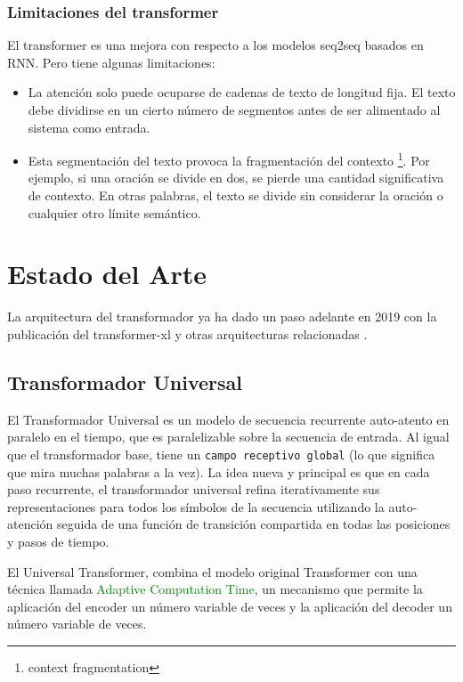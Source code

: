 \documentclass[conference]{IEEEtran}
\begin{document}
\subsubsection{Limitaciones del transformer}
El transformer es una mejora con respecto a los modelos seq2seq basados en RNN. Pero tiene algunas limitaciones:

\begin{itemize}
\item La atenci\'on solo puede ocuparse de cadenas de texto de longitud fija. El texto debe dividirse en un cierto n\'umero de segmentos  antes de ser alimentado al sistema como entrada.
\item Esta segmentaci\'on del texto provoca la fragmentaci\'on del contexto \footnote{context fragmentation}. Por ejemplo, si una oraci\'on se divide en dos, se pierde una cantidad significativa de contexto. En otras palabras, el texto se divide sin considerar la oraci\'on o cualquier otro l\'imite sem\'antico.
\end{itemize}


\section{Estado del Arte}
La arquitectura del transformador ya ha dado un paso adelante en 2019 con la publicaci\'on del transformer-xl \cite{b25} y otras arquitecturas relacionadas \cite{b24, b25, b26, b27, b28, b29}. 


\subsection{Transformador Universal}

El Transformador Universal es un modelo de secuencia recurrente auto-atento en paralelo en el tiempo, que es paralelizable sobre la secuencia de entrada. Al igual que el transformador base, tiene un  \texttt{campo receptivo global} (lo que significa que mira muchas palabras a la vez). La idea nueva y principal es que en cada paso recurrente, el transformador universal refina iterativamente sus representaciones para todos los s\'imbolos de la secuencia utilizando la auto-atenci\'on seguida de una funci\'on de transici\'on compartida en todas las posiciones y pasos de tiempo.

\vspace{0.2cm}

El Universal Transformer, combina el modelo original Transformer con una t\'ecnica llamada \textcolor{green}{Adaptive Computation Time}, un mecanismo que permite la aplicaci\'on del encoder un n\'umero variable de veces y la aplicaci\'on del decoder un n\'umero variable de veces.
\end{document}
